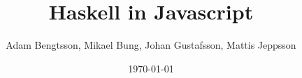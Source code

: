 \documentclass[a4paper, 12pt]{article}
\begin{document}
    \title{Haskell in Javascript}
    \author{Adam Bengtsson, Mikael Bung, Johan Gustafsson, Mattis Jeppsson}
    \date{\today}
    \maketitle
    \newpage

    \tableofcontents
    \newpage

    \listoffigures
    \newpage
    
    \newpage
    
    \newpage
    
    \newpage
    
    \newpage
    
    \newpage
    
    \newpage
    
    \newpage
    
    \newpage
    
    \newpage
    
    \newpage
    

    
     
    
    
\end{document}
